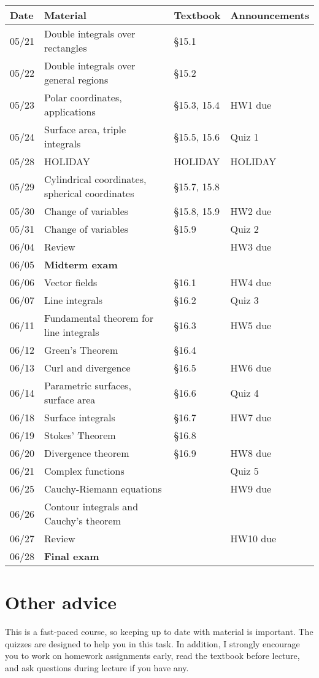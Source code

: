 \documentclass{article}
\begin{document}
\begin{tabular}{| l | l | l | l |}\hline
Date & Material & Textbook & Announcements \\ \hline\hline
05/21 & Double integrals over rectangles & \S 15.1  &  \\
05/22 & Double integrals over general regions & \S 15.2  &  \\
05/23 & Polar coordinates, applications & \S 15.3, 15.4 & HW1 due \\
05/24 & Surface area, triple integrals & \S 15.5, 15.6 & Quiz 1 \\ \hline \hline  
05/28 & HOLIDAY & HOLIDAY & HOLIDAY \\
05/29 & Cylindrical coordinates, spherical coordinates & \S 15.7, 15.8 &   \\
05/30 & Change of variables & \S 15.8, 15.9 & HW2 due \\
05/31 & Change of variables & \S 15.9 & Quiz 2\\ \hline \hline 
06/04 & Review  &  &  HW3 due  \\
06/05 & \textbf{Midterm exam} & &  \\
06/06 & Vector fields & \S 16.1 & HW4 due \\
06/07 & Line integrals & \S 16.2 & Quiz 3 \\ \hline \hline 
06/11 & Fundamental theorem for line integrals & \S 16.3 & HW5 due \\ 
06/12 & Green's Theorem & \S 16.4 &  \\
06/13 & Curl and divergence & \S 16.5 & HW6 due \\
06/14 & Parametric surfaces, surface area & \S 16.6 & Quiz 4\\ \hline \hline 
06/18 & Surface integrals & \S 16.7 & HW7 due \\
06/19 & Stokes' Theorem & \S 16.8 & \\
06/20 & Divergence theorem & \S 16.9 & HW8 due \\
06/21 & Complex functions &  & Quiz 5\\ \hline \hline 
06/25 & Cauchy-Riemann equations & & HW9 due \\
06/26 & Contour integrals and Cauchy's theorem & & \\
06/27 & Review & & HW10 due \\
06/28 & \textbf{Final exam} & & \\ \hline
\end{tabular}


\section*{Other advice}

This is a fast-paced course, so keeping up to date with material is important. The quizzes are designed to help you in this task. In addition, I strongly encourage you to work on homework assignments early, read the textbook before lecture, and ask questions during lecture if you have any. 
\end{document}
